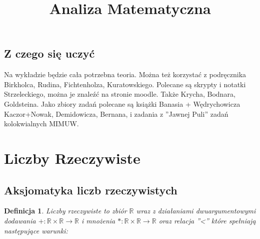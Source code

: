 \documentclass[9pt]{article}
\begin{document}
\title{Analiza Matematyczna}
\author{}
\maketitle

\newcommand{\sat}{\ |\ }
\newcommand{\fb}{\! : \,}
\newcommand{\fa}[1]{\ensuremath{\forall_{#1} \fb}}
\newcommand{\ex}[1]{\ensuremath{\exists_{#1} \fb}}
\newcommand{\seq}[1]{\ensuremath{\left(#1\right)_{n = 1,2,...}}}
\newcommand{\seqq}[2]{\ensuremath{\left(#1\right)_{#2 = 1,2,...}}}
\newcommand{\N}{\ensuremath{\mathbb{N}}}
\newcommand{\R}{\ensuremath{\mathbb{R}}}
\newcommand{\Z}{\ensuremath{\mathbb{Z}}}
\newcommand{\Q}{\ensuremath{\mathbb{Q}}}
\newcommand{\C}{\ensuremath{\mathbb{C}}}
\newcommand{\for}{\ensuremath{\text{ dla }}}
\newcommand{\tg}{\operatorname{tg}}
\newcommand{\arctg}{\operatorname{arctg}}

\newtheorem{Twi}{Twierdzenie}
\newtheorem{Def}{Definicja}
\newtheorem{Lem}{Lemat}
\newtheorem{Przy}{Przykład}
\newtheorem{Wni}{Wniosek}

\subsection*{Z czego się uczyć}

Na wykładzie będzie cała potrzebna teoria. Można też korzystać z podręcznika Birkholca, Rudina,
Fichtenholza, Kuratowskiego. Polecane są skrypty i notatki Strzeleckiego, można je znaleźć na
stronie moodle. Także Krycha, Bodnara, Goldsteina. Jako zbiory zadań polecane są książki Banasia +
Wędrychowicza Kaczor+Nowak, Demidowicza, Bernana, i zadania z ''Jawnej Puli'' zadań kolokwialnych
MIMUW.

\section{Liczby Rzeczywiste}

\subsection{Aksjomatyka liczb rzeczywistych}

\begin{Def}
    Liczby rzeczywiste to zbiór $\mathbb{R} $ wraz z działaniami dwuargumentowymi dodawania $+:
    \mathbb{R}\times \mathbb{R} \rightarrow \mathbb{R}$ i mnożenia $*: \mathbb{R}\times\mathbb{R} \rightarrow \mathbb{R}$ oraz relacja ''<'' które spełniają następujące warunki:
\end{Def}
\end{document}
